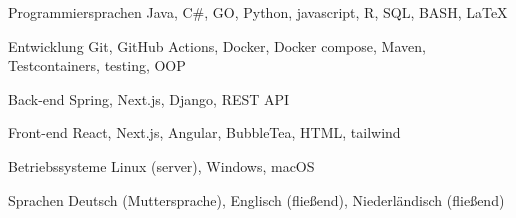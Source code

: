 
\begin{cvskills}
  
    \cvskill
      {Programmiersprachen} %
      {Java, C\#, GO, Python, javascript, R, SQL, BASH, LaTeX} %

  \cvskill
    {Entwicklung} %
    {Git, GitHub Actions, Docker, Docker compose, Maven, Testcontainers, testing, OOP} %

  \cvskill
    {Back-end} %
    {Spring, Next.js, Django, REST API} %

  \cvskill
    {Front-end} %
    {React, Next.js, Angular, BubbleTea, HTML, tailwind} %

  \cvskill
  {Betriebssysteme} %
  {Linux (server), Windows, macOS} %

  \cvskill
    {Sprachen} %
    {Deutsch (Muttersprache), Englisch (fließend), Niederländisch (fließend)} %

\end{cvskills}
